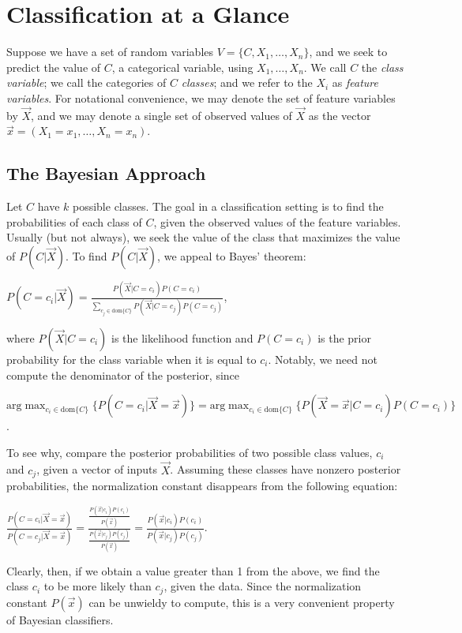 \documentclass[12pt,twoside]{reedthesis}
\begin{document}
	\section{Classification at a Glance}

	Suppose we have a set of random variables $V = \{C, X_1, \ldots, X_n\}$, and we seek to predict the value of $C$, a categorical variable, using $X_1, \ldots, X_n$. We call $C$ the {\em class variable}; we call the categories of $C$ {\em classes}; and we refer to the $X_i$ as {\em feature variables}. For notational convenience, we may denote the set of feature variables by $\vec{X}$, and we may denote a single set of observed values of $\vec{X}$ as the vector $\vec{x} = (X_1 = x_1, \ldots, X_n = x_n)$.
	\subsection*{The Bayesian Approach}
	Let $C$ have $k$ possible classes. 
	The goal in a classification setting is to find the probabilities of each class of $C$, given the observed values of the feature variables. Usually (but not always), we seek the value of the class that maximizes the value of $P(C | \vec{X})$. To find $P(C | \vec{X})$, we appeal to Bayes' theorem:
	\begin{center}
		$P(C = c_i | \vec{X}) = \displaystyle\frac{P(\vec{X} | C = c_i) P(C = c_i)}{\displaystyle\sum_{c_j \in \textrm{dom}\{C\}} P(\vec{X} | C = c_j)P(C=c_j)}$,
	\end{center}
	where $P(\vec{X} | C = c_i)$ is the likelihood function and $P(C = c_i)$ is the prior probability for the class variable when it is equal to $c_i$. Notably, we need not compute the denominator of the posterior, since
	\begin{center} 
	$\displaystyle\textrm{arg}\max_{c_i \in \textrm{dom}\{C\}}{\{ P(C=c_i | \vec{X} = \vec{x}) \}} = \displaystyle\textrm{arg}\max_{c_i \in \textrm{dom}\{C\}}\{ P(\vec{X} = \vec{x} | C = c_i) P(C=c_i) \}$.
	\end{center}
	To see why, compare the posterior probabilities of two possible class values, $c_i$ and $c_j$, given a vector of inputs $\vec{X}$. Assuming these classes have nonzero posterior probabilities, the normalization constant disappears from the following equation:
	\begin{center}
		$\displaystyle\frac{P(C=c_i | \vec{X} = \vec{x})}{P(C=c_j | \vec{X} = \vec{x})} = 
		\displaystyle\frac{\displaystyle\frac{P(\vec{x} | c_i)P( c_i)}{P(\vec{x})}}{\displaystyle\frac{P(\vec{x} | c_j) P( c_j)}{P(\vec{x})}} = \frac{P(\vec{x} | c_i) P( c_i)}{P(\vec{x} | c_j) P( c_j)}$.
	\end{center}
	Clearly, then, if we obtain a value greater than 1 from the above, we find the class $c_i$ to be more likely than $c_j$, given the data. Since the normalization constant $P(\vec{x})$ can be unwieldy to compute, this is a very convenient property of Bayesian classifiers. 
\end{document}
